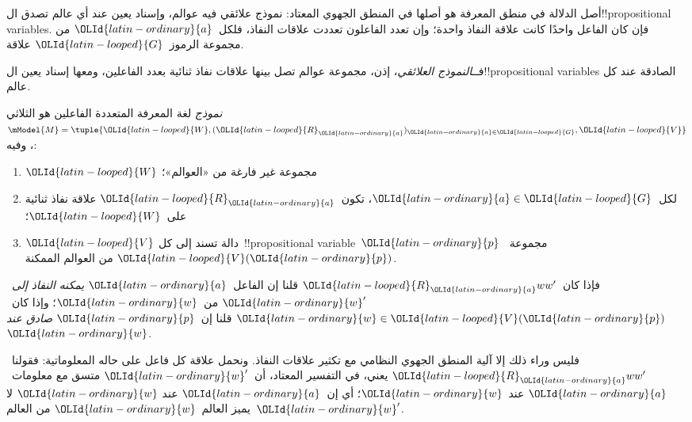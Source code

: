 \documentclass[../../../include/open-logic-section]{subfiles}
\begin{document}


أصل الدلالة في منطق المعرفة هو أصلها في المنطق الجهوي المعتاد: نموذج
علائقي فيه عوالم، وإسناد يعين عند أي عالم تصدق ال!!{propositional variable}s.
فإن كان الفاعل واحدًا كانت علاقة النفاذ واحدة؛ وإن تعدد الفاعلون تعددت
علاقات النفاذ، فلكل~$\OLId{latin-ordinary}{a}$ من مجموعة الرموز~$\OLId{latin-looped}{G}$ علاقة.

فــ\emph{النموذج العلائقي}، إذن، مجموعة عوالم تصل بينها علاقات نفاذ
ثنائية بعدد الفاعلين، ومعها إسناد يعين ال!!{propositional variable}s
الصادقة عند كل عالم.

\begin{defn}
  \emph{نموذج} لغة المعرفة المتعددة الفاعلين هو الثلاثي
  $\mModel{M}=\tuple{\OLId{latin-looped}{W},(\OLId{latin-looped}{R}_\OLId{latin-ordinary}{a})_{\OLId{latin-ordinary}{a} \in \OLId{latin-looped}{G}},\OLId{latin-looped}{V}}$، وفيه:
  \begin{enumerate}
  \item $\OLId{latin-looped}{W}$ مجموعة غير فارغة من «العوالم»؛
  \item لكل~$\OLId{latin-ordinary}{a} \in \OLId{latin-looped}{G}$، تكون~${\OLId{latin-looped}{R}}_\OLId{latin-ordinary}{a}$ علاقة نفاذ ثنائية على~$\OLId{latin-looped}{W}$؛
  \item $\OLId{latin-looped}{V}$ دالة تسند إلى كل~!!{propositional
    variable}~$\OLId{latin-ordinary}{p}$ مجموعة~$\OLId{latin-looped}{V}(\OLId{latin-ordinary}{p})$ من العوالم الممكنة.
  \end{enumerate}
  فإذا كان~$\OLId{latin-looped}{R}_\OLId{latin-ordinary}{a} ww'$ قلنا إن الفاعل~$\OLId{latin-ordinary}{a}$ \emph{يمكنه النفاذ إلى}~$\OLId{latin-ordinary}{w}'$
  من~$\OLId{latin-ordinary}{w}$؛ وإذا كان~$\OLId{latin-ordinary}{w} \in \OLId{latin-looped}{V}(\OLId{latin-ordinary}{p})$ قلنا إن~$\OLId{latin-ordinary}{p}$ \emph{صادق عند}~$\OLId{latin-ordinary}{w}$.
\end{defn}

فليس وراء ذلك إلا آلية المنطق الجهوي النظامي مع تكثير علاقات النفاذ.
ونحمل علاقة كل فاعل على حاله المعلوماتية: فقولنا~$\OLId{latin-looped}{R}_\OLId{latin-ordinary}{a} ww'$ يعني، في
التفسير المعتاد، أن~$\OLId{latin-ordinary}{w}'$ متسق مع معلومات~$\OLId{latin-ordinary}{a}$ عند~$\OLId{latin-ordinary}{w}$؛ أي إن~$\OLId{latin-ordinary}{a}$ عند
$\OLId{latin-ordinary}{w}$ لا يميز العالم~$\OLId{latin-ordinary}{w}$ من العالم~$\OLId{latin-ordinary}{w}'$.
\end{document}
